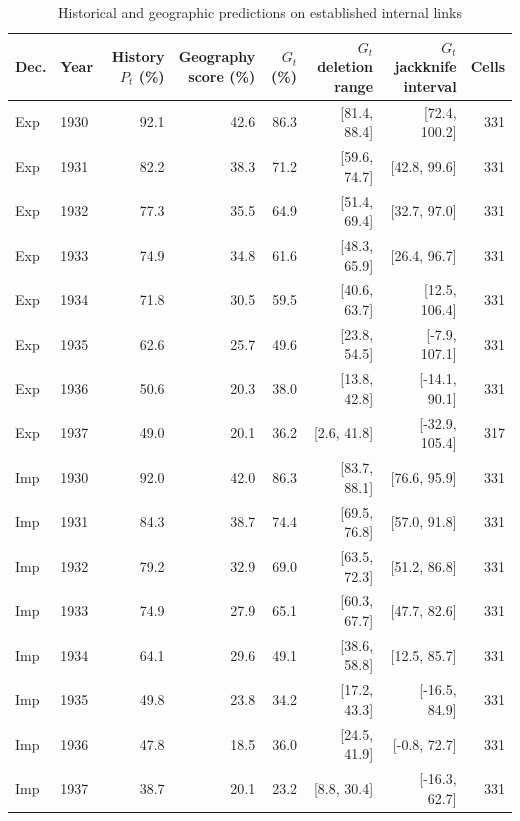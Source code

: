 \begin{table}[!htbp]\centering
\caption{Historical and geographic predictions on established internal links}\label{tab:app_geography}
\begin{threeparttable}\footnotesize\setlength{\tabcolsep}{4pt}
\begin{tabular}{@{}llrrrrrr@{}}
\toprule
Dec. & Year & \shortstack{History\\$P_t$ (\%)} & \shortstack{Geography\\score (\%)} & $G_t$ (\%) & \shortstack{$G_t$ deletion\\range} & \shortstack{$G_t$ jackknife\\interval} & Cells \\
\midrule
Exp & 1930 & 92.1 & 42.6 & 86.3 & [81.4, 88.4] & [72.4, 100.2] & 331 \\
Exp & 1931 & 82.2 & 38.3 & 71.2 & [59.6, 74.7] & [42.8, 99.6] & 331 \\
Exp & 1932 & 77.3 & 35.5 & 64.9 & [51.4, 69.4] & [32.7, 97.0] & 331 \\
Exp & 1933 & 74.9 & 34.8 & 61.6 & [48.3, 65.9] & [26.4, 96.7] & 331 \\
Exp & 1934 & 71.8 & 30.5 & 59.5 & [40.6, 63.7] & [12.5, 106.4] & 331 \\
Exp & 1935 & 62.6 & 25.7 & 49.6 & [23.8, 54.5] & [-7.9, 107.1] & 331 \\
Exp & 1936 & 50.6 & 20.3 & 38.0 & [13.8, 42.8] & [-14.1, 90.1] & 331 \\
Exp & 1937 & 49.0 & 20.1 & 36.2 & [2.6, 41.8] & [-32.9, 105.4] & 317 \\
Imp & 1930 & 92.0 & 42.0 & 86.3 & [83.7, 88.1] & [76.6, 95.9] & 331 \\
Imp & 1931 & 84.3 & 38.7 & 74.4 & [69.5, 76.8] & [57.0, 91.8] & 331 \\
Imp & 1932 & 79.2 & 32.9 & 69.0 & [63.5, 72.3] & [51.2, 86.8] & 331 \\
Imp & 1933 & 74.9 & 27.9 & 65.1 & [60.3, 67.7] & [47.7, 82.6] & 331 \\
Imp & 1934 & 64.1 & 29.6 & 49.1 & [38.6, 58.8] & [12.5, 85.7] & 331 \\
Imp & 1935 & 49.8 & 23.8 & 34.2 & [17.2, 43.3] & [-16.5, 84.9] & 331 \\
Imp & 1936 & 47.8 & 18.5 & 36.0 & [24.5, 41.9] & [-0.8, 72.7] & 331 \\
Imp & 1937 & 38.7 & 20.1 & 23.2 & [8.8, 30.4] & [-16.3, 62.7] & 331 \\
\bottomrule
\end{tabular}

\end{threeparttable}
\end{table}
